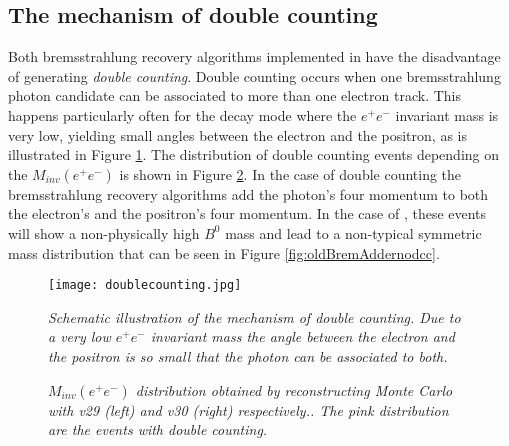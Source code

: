 \subsection{The mechanism of double counting}
\label{sec:doublecounting}
Both bremsstrahlung recovery algorithms implemented in \davinci have the disadvantage of generating \textit{double counting}. Double counting occurs when one bremsstrahlung photon candidate can be associated to more than one electron track. This happens particularly often for the \BdKstee decay mode where the $e^+e^-$ invariant mass is very low, yielding small angles between the electron and the positron, as is illustrated in Figure \ref{fig:schemdc}. The distribution of double counting events depending on the $M_{inv}(e^+e^-)$ is shown in Figure \ref{fig:Minveedouble counting}. In the case of double counting the bremsstrahlung recovery algorithms add the photon's four momentum to both the electron's and the positron's four momentum. In the case of \BdKstee, these events will show a non-physically high $B^0$ mass and lead to a non-typical symmetric \Bd mass distribution that can be seen in Figure \ref{fig:oldBremAddernodcc}. 
\begin{figure}[ht]
\vspace*{-0.5cm}
  \begin{center}
  \label{fig:newBremAdder}
  \texttt{[image: doublecounting.jpg]}
  \end{center}
  \vspace*{-0.5cm}
  \caption{\textit{Schematic illustration of the mechanism of double counting. Due to a very low $e^+e^-$ invariant mass the angle between the electron and the positron is so small that the photon can be associated to both.}}
  \label{fig:schemdc}
  \vspace*{-0.5cm}
\end{figure}

\begin{figure}[ht]
  \begin{center}
  \vspace*{-.6cm}
  \vspace*{-1.0cm}
  \end{center}
  \caption{\textit{$M_{inv}(e^+e^-)$ distribution obtained by reconstructing \lhcb Monte Carlo with \davinci v29 (left) and \davinci v30 (right) respectively.. The pink distribution are the events with double counting.}}
  \label{fig:Minveedouble counting}
  \vspace*{-0.5cm}
\end{figure}


